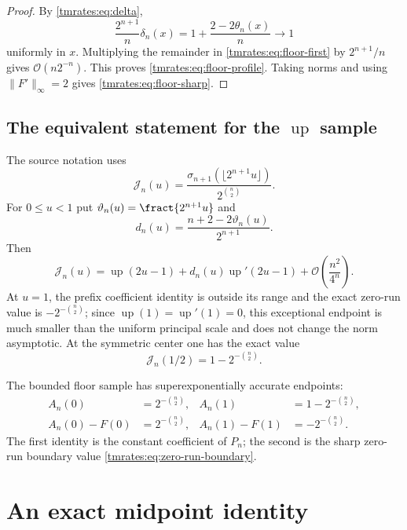 \documentclass[11pt,oneside]{article}
\theoremstyle{definition}
\theoremstyle{remark}
\newcommand{\Up}{\operatorname{up}}
\newcommand{\bigO}{\mathcal O}
\begin{document}
\begin{proof}
By \eqref{tmrates:eq:delta},
\[
 \frac{2^{n+1}}n\delta_n(x)
 =1+\frac{2-2\theta_n(x)}n\longrightarrow1
\]
uniformly in $x$.  Multiplying the remainder in \eqref{tmrates:eq:floor-first} by
$2^{n+1}/n$ gives $\bigO(n2^{-n})$.  This proves \eqref{tmrates:eq:floor-profile}.  Taking norms and
using $\|F'\|_\infty=2$ gives \eqref{tmrates:eq:floor-sharp}.
\end{proof}

\subsection{The equivalent statement for the \texorpdfstring{$\Up$}{Up} sample}

The source notation uses
\begin{equation}
 \mathcal J_n(u)
 =\frac{\sigma_{n+1}(\lfloor2^{n+1}u\rfloor)}{2^{\binom n2}}.
\end{equation}
For $0\le u<1$ put $\vartheta_n(u)=\fract{2^{n+1}u}$ and
\begin{equation}
 d_n(u)=\frac{n+2-2\vartheta_n(u)}{2^{n+1}}.
\end{equation}
Then
\begin{equation}
 \mathcal J_n(u)
 =\Up(2u-1)+d_n(u)\Up'(2u-1)
  +\bigO\!\left(\frac{n^2}{4^n}\right).                  \label{tmrates:eq:J-expansion}
\end{equation}
At $u=1$, the prefix coefficient identity is outside its range and the exact zero-run value is
$-2^{-\binom n2}$; since $\Up(1)=\Up'(1)=0$, this exceptional endpoint is much smaller than
the uniform principal scale and does not change the norm asymptotic.
At the symmetric center one has the exact value
\begin{equation}
 \mathcal J_n(1/2)=1-2^{-\binom n2}.
 \label{tmrates:eq:J-half}
\end{equation}

The bounded floor sample has superexponentially accurate endpoints:
\begin{align}
 A_n(0)&=2^{-\binom n2}, &
 A_n(1)&=1-2^{-\binom n2},
 \label{tmrates:eq:endpoint-values}\\
 A_n(0)-F(0)&=2^{-\binom n2}, &
 A_n(1)-F(1)&=-2^{-\binom n2}.
 \label{tmrates:eq:endpoint-errors}
\end{align}
The first identity is the constant coefficient of $P_n$; the second is the sharp
zero-run boundary value \eqref{tmrates:eq:zero-run-boundary}.

\section{An exact midpoint identity}
\label{tmrates:sec:midpoint}
\end{document}
